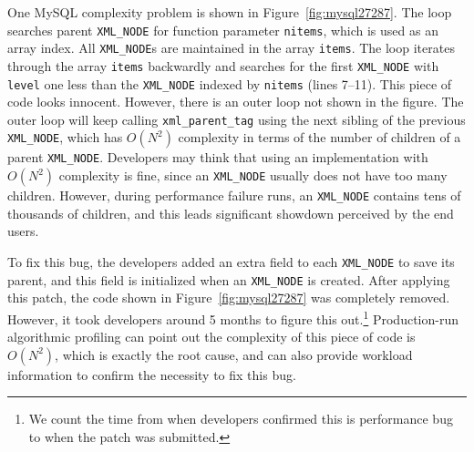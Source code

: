 


One MySQL complexity problem is shown in Figure~\ref{fig:mysql27287}.
The loop searches parent \texttt{XML\_NODE} for function parameter \texttt{nitems},
which is used as an array index. 
All \texttt{XML\_NODE}s are maintained in the array \texttt{items}.
The loop iterates through the array \texttt{items}
backwardly and searches for the first \texttt{XML\_NODE} 
with \texttt{level} one less than the \texttt{XML\_NODE} 
indexed by \texttt{nitems} (lines 7--11).
This piece of code looks innocent.
However, there is an outer loop not shown in the figure.
The outer loop will keep calling \texttt{xml\_parent\_tag} using
the next sibling of the previous \texttt{XML\_NODE},
which has $O(N^2)$ complexity in terms of the number of children of a parent \texttt{XML\_NODE}.
Developers may think that using an implementation with $O(N^2)$ complexity is fine,
since an \texttt{XML\_NODE} usually does not have too many children.
However, during performance failure runs,
an \texttt{XML\_NODE} contains tens of thousands of children,
and this leads significant showdown perceived by the end users.

To fix this bug, the developers added an extra field to each \texttt{XML\_NODE} to save its parent,
and this field is initialized when an \texttt{XML\_NODE} is created.
After applying this patch, the code shown in Figure~\ref{fig:mysql27287} was completely removed.
However, it took developers around 5 months to figure this
out.\footnote{We count the time from when developers confirmed this is performance bug
to when the patch was submitted.}
Production-run algorithmic profiling 
can point out the complexity of this piece of code is $O(N^2)$, 
which is exactly the root cause, 
and can also provide workload information 
to confirm the necessity to fix this bug.


